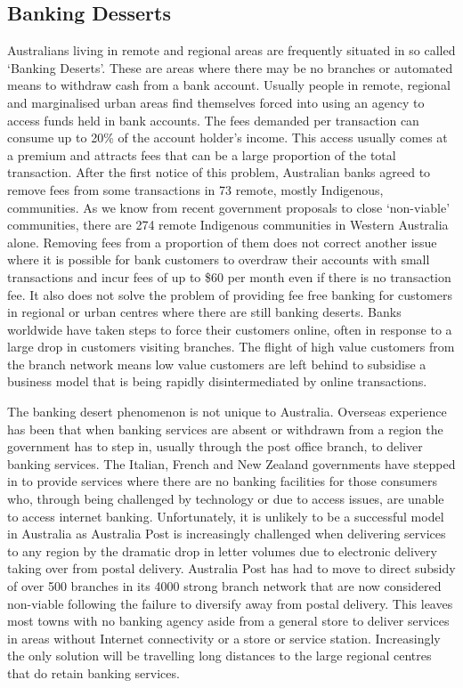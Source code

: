 \subsection{Banking Desserts}
Australians living in remote and regional areas  are frequently situated in so called `Banking Deserts'. These are areas where there may be no branches or automated means to withdraw cash from a bank account. Usually people in remote, regional and marginalised urban areas find themselves forced into using an agency to access funds held in bank accounts. The fees demanded per transaction can consume up to 20\% of the account holder’s income\cite{RefWorks:379}. This access usually comes at a premium and attracts fees that can be a large proportion of the total transaction. After the first notice of this problem, Australian banks agreed to remove fees from some transactions in 73 remote, mostly Indigenous, communities. As we know from recent government proposals to close ‘non-viable’ communities, there are 274 remote Indigenous communities in Western Australia alone\cite{Kagi2015}. Removing fees from a proportion of them does not correct another issue where it is possible for bank customers to overdraw their accounts with small transactions and incur fees of up to \$60 per month even if there is no transaction fee\cite{ANZ2013}. It also does not solve the problem of providing fee free banking for customers in regional or urban centres where there are still banking deserts. Banks worldwide have taken steps to force their customers online, often in response to a large drop in customers visiting branches. The flight of high value customers from the branch network means low value customers are left behind to subsidise a business model that is being rapidly disintermediated by online transactions. 

The banking desert phenomenon is not unique to Australia. Overseas experience has been that when banking services are absent or withdrawn from a region the government has to step in, usually through the post office branch, to deliver banking services. The Italian, French and New Zealand governments have stepped in to provide services where there are no banking facilities for those consumers who, through being challenged by technology or due to access issues, are unable to access internet banking\cite{holland2014}. Unfortunately, it is unlikely to be a successful model in Australia as Australia Post is increasingly challenged when delivering services to any region by the dramatic drop in letter volumes due to electronic delivery taking over from postal delivery\cite{Post2015}. Australia Post has had to move to direct subsidy of over 500 branches in its 4000 strong branch network that are now considered non-viable following the failure to diversify away from postal delivery\cite{Post2015}\cite{smartco2015}. This leaves most towns with no banking agency aside from a general store to deliver services in areas without Internet connectivity or a store or service station. Increasingly the only solution will be travelling long distances to the large regional centres that do retain banking services.


